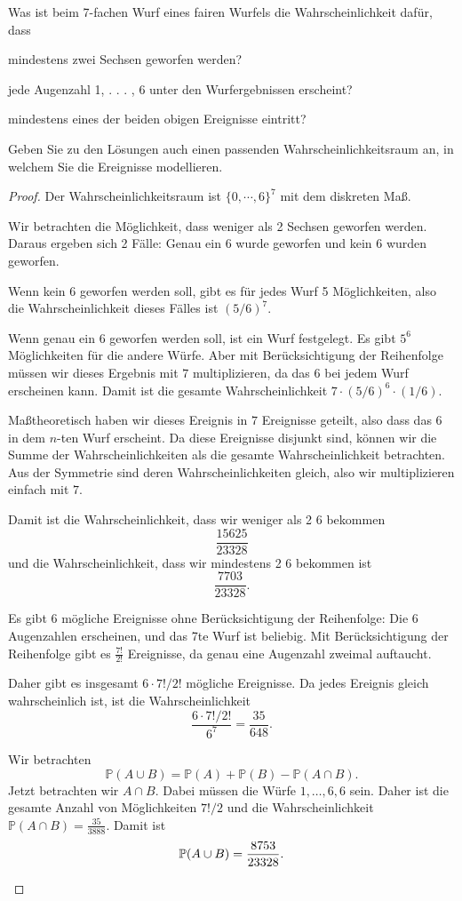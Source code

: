 \begin{Problem}
	Was ist beim 7-fachen Wurf eines fairen Wurfels die Wahrscheinlichkeit daf\"{u}r, dass	
\begin{parts}
\item mindestens zwei Sechsen geworfen werden?
\item jede Augenzahl 1, . . . , 6 unter den Wurfergebnissen erscheint?
\item mindestens eines der beiden obigen Ereignisse eintritt?
\end{parts}
Geben Sie zu den L\"{o}sungen auch einen passenden Wahrscheinlichkeitsraum an, in welchem Sie die Ereignisse modellieren.
\end{Problem}
\begin{proof}
	Der Wahrscheinlichkeitsraum ist $\{0,\cdots, 6\}^7$ mit dem diskreten Maß.
	\begin{parts}
	\item Wir betrachten die Möglichkeit, dass weniger als 2 Sechsen geworfen werden. Daraus ergeben sich 2 Fälle: Genau ein $6$ wurde geworfen und kein $6$ wurden geworfen. 

		Wenn kein $6$ geworfen werden soll, gibt es für jedes Wurf 5 Möglichkeiten, also die Wahrscheinlichkeit dieses Fälles ist $(5 / 6)^7$.

		Wenn genau ein $6$ geworfen werden soll, ist ein Wurf festgelegt. Es gibt $5^6$ Möglichkeiten für die andere Würfe. Aber mit Berücksichtigung der Reihenfolge müssen wir dieses Ergebnis mit $7$ multiplizieren, da das $6$ bei jedem Wurf erscheinen kann. Damit ist die gesamte Wahrscheinlichkeit $7\cdot (5 / 6)^6 \cdot (1 / 6)$.

		Maßtheoretisch haben wir dieses Ereignis in $7$ Ereignisse geteilt, also dass das $6$ in dem $n$-ten Wurf erscheint. Da diese Ereignisse disjunkt sind, können wir die Summe der Wahrscheinlichkeiten als die gesamte Wahrscheinlichkeit betrachten. Aus der Symmetrie sind deren Wahrscheinlichkeiten gleich, also wir multiplizieren einfach mit $7$. 
	
Damit ist die Wahrscheinlichkeit, dass wir weniger als 2 $6$ bekommen
\[\frac{15625}{23328}\]
und die Wahrscheinlichkeit, dass wir mindestens 2 $6$ bekommen ist
\[
\frac{7703}{23328}
.\] 
\item Es gibt $6$ mögliche Ereignisse ohne Berücksichtigung der Reihenfolge: Die $6$ Augenzahlen erscheinen, und das 7te Wurf ist beliebig. Mit Berücksichtigung der Reihenfolge gibt es $\frac{7!}{2!}$ Ereignisse, da genau eine Augenzahl zweimal auftaucht.

	Daher gibt es insgesamt $6\cdot 7! / 2!$ mögliche Ereignisse. Da jedes Ereignis gleich wahrscheinlich ist, ist die Wahrscheinlichkeit
	 \[
	\frac{6\cdot 7! / 2!}{6^7}=\frac{35}{648}
	.\] 
\item Wir betrachten
	\[
	\mathbb{P}(A\cup B)=\mathbb{P}(A)+\mathbb{P}(B)-\mathbb{P}(A\cap B)
	.\] 
	Jetzt betrachten wir $A\cap B$. Dabei müssen die Würfe $1,\dots, 6, 6$ sein. Daher ist die gesamte Anzahl von Möglichkeiten $7! / 2$ und die Wahrscheinlichkeit $\mathbb{P}(A\cap B)=\frac{35}{3888}$. Damit ist
	\[
	\mathbb{P}(A\cup B)=\frac{8753}{23328}
	.\qedhere\] 
	\end{parts}
\end{proof}

